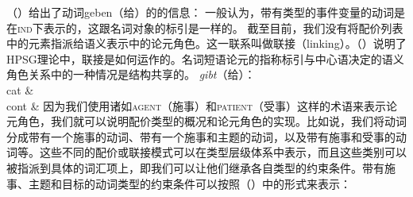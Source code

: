 （）给出了动词geben（给）的\contvc 的信息：
\ea
\label{mrs-geben}
\z
一般认为，带有类型的事件变量的动词是在\textsc{ind}下表示的，这跟名词对象的标引是一样的。 
截至目前，我们没有将配价列表中的元素指派给语义表示中的论元角色。这一联系叫做联接（linking）。（）说明了HPSG理论中，联接是如何运作的。名词短语论元的指称标引与中心语决定的语义角色关系中的一种情况是结构共享的。
\eas
\label{le-geben}
\emph{gibt}（给）：\\
\ms
{ cat &  \\
  cont &  
}
\zs
因为我们使用诸如\textsc{agent}（施事）和\textsc{patient}（受事）这样的术语来表示论元角色，我们就可以说明配价类型的概况和论元角色的实现。比如说，我们将动词分成带有一个施事的动词、带有一个施事和主题的动词，以及带有施事和受事的动词等。这些不同的配价或联接模式可以在类型层级体系中表示，而且这些类别可以被指派到具体的词汇项上，即我们可以让他们继承各自类型的约束条件。带有施事、主题和目标的动词类型的约束条件可以按照（）中的形式来表示：
